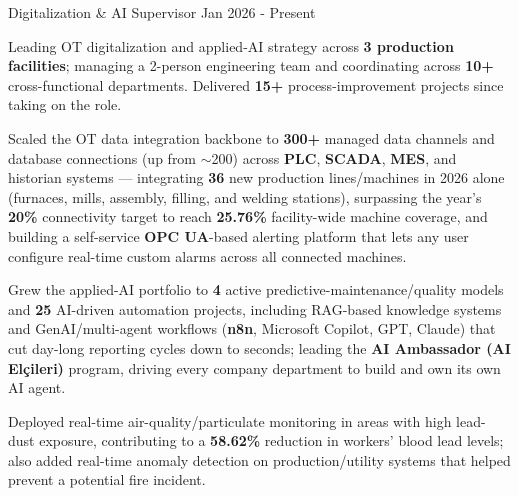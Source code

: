 
\vspace{-3mm}

\begin{cventries}

  \cventry
    {Digitalization \& AI Supervisor} %
    {} %
    {} %
    {Jan 2026 - Present} %
    {
      \begin{cvitems} %
        \item {Leading OT digitalization and applied-AI strategy across \textbf{3 production facilities}; managing a 2-person engineering team and coordinating across \textbf{10+} cross-functional departments. Delivered \textbf{15+} process-improvement projects since taking on the role.}
        \item {Scaled the OT data integration backbone to \textbf{300+} managed data channels and database connections (up from $\sim$200) across \textbf{PLC}, \textbf{SCADA}, \textbf{MES}, and historian systems --- integrating \textbf{36} new production lines/machines in 2026 alone (furnaces, mills, assembly, filling, and welding stations), surpassing the year's \textbf{20\%} connectivity target to reach \textbf{25.76\%} facility-wide machine coverage, and building a self-service \textbf{OPC UA}-based alerting platform that lets any user configure real-time custom alarms across all connected machines.}
        \item {Grew the applied-AI portfolio to \textbf{4} active predictive-maintenance/quality models and \textbf{25} AI-driven automation projects, including RAG-based knowledge systems and GenAI/multi-agent workflows (\textbf{n8n}, Microsoft Copilot, GPT, Claude) that cut day-long reporting cycles down to seconds; leading the \textbf{AI Ambassador (AI Elçileri)} program, driving every company department to build and own its own AI agent.}
        \item {Deployed real-time air-quality/particulate monitoring in areas with high lead-dust exposure, contributing to a \textbf{58.62\%} reduction in workers' blood lead levels; also added real-time anomaly detection on production/utility systems that helped prevent a potential fire incident.}

\end{cvitems}}
\end{cventries}
